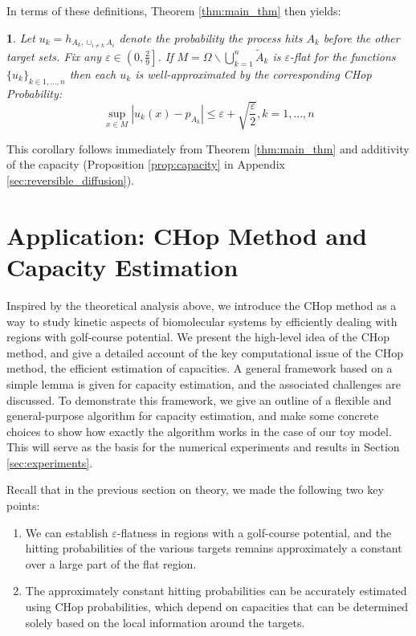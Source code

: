 \documentclass[english, aip, jcp, priprint, graphicx,floatfix]{revtex4-1}
\theoremstyle{plain}
\theoremstyle{definition}
\theoremstyle{plain}
\newtheorem{cor}[thm]{\protect\corollaryname}
\providecommand{\corollaryname}{Corollary}
\begin{document}
In terms of these definitions, Theorem \ref{thm:main_thm} then yields:

\begin{cor}\label{thm:main_cor} Let $u_k = h_{A_k,\cup_{i\neq k} A_i}$ denote the probability the process hits $A_k$ before the other target sets.  Fix any $\varepsilon \in \left( 0, \frac{2}{9} \right]$.  If $M = \Omega \backslash \bigcup_{k = 1}^n \tilde{A}_k $ is $\varepsilon$-flat for the functions $\{u_k\}_{k\in1,\dots, n}$ then each $u_k$ is well-approximated by the corresponding CHop Probability:
\[ \sup_{x \in M} \left| u_k (x) - p_{A_k} \right| \leqslant \varepsilon + \sqrt{\frac{\varepsilon}{2}}, k=1,\dots, n\]
\end{cor}

This corollary follows immediately from Theorem \ref{thm:main_thm} and additivity of the capacity (Proposition \ref{prop:capacity} in Appendix \ref{sec:reversible_diffusion}). 

\section{Application: CHop Method and Capacity Estimation}\label{sec:algorithm}

Inspired by the theoretical analysis above, we introduce the CHop method as a way to study kinetic aspects of biomolecular systems by efficiently dealing with regions with golf-course potential. We present the high-level idea of the CHop method, and give a detailed account of the key computational issue of the CHop method, the efficient estimation of capacities. A general framework based on a simple lemma is given for capacity estimation, and the associated challenges are discussed. To demonstrate this framework, we give an outline of a flexible and general-purpose algorithm for capacity estimation, and make some concrete choices to show how exactly the algorithm works in the case of our toy model. This will serve as the basis for the numerical experiments and results in Section \ref{sec:experiments}.

Recall that in the previous section on theory, we made the following two key points:

\begin{enumerate}
    \item We can establish $\varepsilon$-flatness in regions with a golf-course potential, and the hitting probabilities of the various targets remains approximately a constant over a large part of the flat region.
    \item The approximately constant hitting probabilities can be accurately estimated using CHop probabilities, which depend on capacities that can be determined solely based on the local information around the targets.
\end{enumerate}
\end{document}
